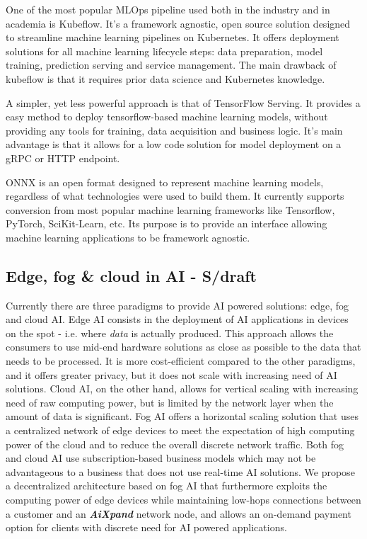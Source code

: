 \documentclass{article}
\begin{document}
One of the most popular MLOps pipeline used both in the industry and in academia is Kubeflow. It's a framework agnostic, open source solution designed to streamline machine learning pipelines on Kubernetes. It offers deployment solutions for all machine learning lifecycle steps: data preparation, model training, prediction serving and service management. The main drawback of kubeflow is that it requires prior data science and Kubernetes knowledge.

A simpler, yet less powerful approach is that of TensorFlow Serving. It provides a easy method to deploy tensorflow-based machine learning models, without providing any tools for training, data acquisition and business logic. It's main advantage is that it allows for a low code solution for model deployment on a gRPC or HTTP endpoint.

ONNX is an open format designed to represent machine learning models, regardless of what technologies were used to build them. It currently supports conversion from most popular machine learning frameworks like Tensorflow, PyTorch, SciKit-Learn, etc. Its purpose is to provide an interface allowing machine learning applications to be framework agnostic.

\subsection{Edge, fog \& cloud in AI - S/draft}
Currently there are three paradigms to provide AI powered solutions: edge, fog and cloud AI. Edge AI \cite{wang2020edge} consists in the deployment of AI applications in devices on the spot - i.e. where \textit{data} is actually produced. This approach allows the consumers to use mid-end hardware solutions as close as possible to the data that needs to be processed. It is more cost-efficient compared to the other paradigms, and it offers greater privacy, but it does not scale with increasing need of AI solutions. Cloud AI, on the other hand, allows for vertical scaling with increasing need of raw computing power, but is limited by the network layer when the amount of data is significant. Fog AI offers a horizontal scaling solution that uses a centralized network of edge devices to meet the expectation of high computing power of the cloud and to reduce the overall discrete network traffic. Both fog and cloud AI use subscription-based business models which may not be advantageous to a business that does not use real-time AI solutions. We propose a decentralized architecture based on fog AI that furthermore exploits the computing power of edge devices while maintaining low-hops connections between a customer and an \textbf{\textit{AiXpand}} network node, and allows an on-demand payment option for clients with discrete need for AI powered applications. 
\end{document}
